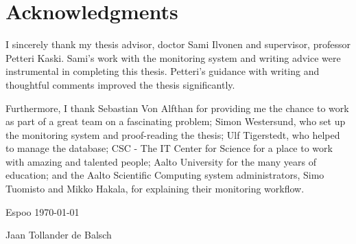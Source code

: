 \section*{Acknowledgments}
I sincerely thank my thesis advisor, doctor Sami Ilvonen and supervisor, professor Petteri Kaski.
Sami's work with the monitoring system and writing advice were instrumental in completing this thesis.
Petteri's guidance with writing and thoughtful comments improved the thesis significantly.

Furthermore, I thank Sebastian Von Alfthan for providing me the chance to work as part of a great team on a fascinating problem; 
Simon Westersund, who set up the monitoring system and proof-reading the thesis; 
Ulf Tigerstedt, who helped to manage the database; 
CSC - The IT Center for Science for a place to work with amazing and talented people; 
Aalto University for the many years of education; 
and the Aalto Scientific Computing system administrators, Simo Tuomisto and Mikko Hakala, for explaining their monitoring workflow.

\vspace{5cm}
Espoo \today

\vspace{5mm}
{\hfill Jaan Tollander de Balsch \hspace{1cm}}

\newpage

\setcounter{tocdepth}{2}
\tableofcontents
